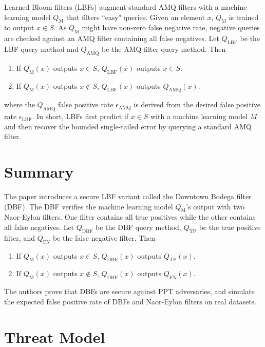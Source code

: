 \documentclass{article}
\begin{document}
Learned Bloom filters (LBFs) \cite{kraska_beutel_chi_dean_polyzotis_2018} augment standard AMQ filters with a machine learning model $Q_\text{M}$ that filters ``easy" queries. Given an element $x$, $Q_\text{M}$ is trained to output $x \in S$. As $Q_\text{M}$ might have non-zero false negative rate, negative queries are checked against an AMQ filter containing all false negatives. Let $Q_\text{LBF}$ be the LBF query method and $Q_\text{AMQ}$ be the AMQ filter query method. Then
\begin{enumerate}
    \item If $Q_\text{M}(x)$ outputs $x \in S$, $Q_\text{LBF}(x)$ outputs $x \in S$.
    \item If $Q_\text{M}(x)$ outputs $x \not \in S$, $Q_\text{LBF}(x)$ outputs $Q_\text{AMQ}(x)$.
\end{enumerate}
where the $Q_\text{AMQ}$ false positive rate $\epsilon_\text{AMQ}$ is derived from the desired false positive rate $\epsilon_\text{LBF}$. In short, LBFs first predict if $x \in S$ with a machine learning model $M$ and then recover the bounded single-tailed error by querying a standard AMQ filter.

\section{Summary}

The paper \cite{bishop_tirmazi_2025} introduces a secure LBF variant called the Downtown Bodega filter (DBF). The DBF verifies the machine learning model $Q_\text{M}$'s output with two Naor-Eylon filters. One filter contains all true positives while the other contains all false negatives. Let $Q_\text{DBF}$ be the DBF query method, $Q_\text{TP}$ be the true positive filter, and $Q_\text{FN}$ be the false negative filter. Then
\begin{enumerate}
    \item If $Q_\text{M}(x)$ outputs $x \in S$, $Q_\text{DBF}(x)$ outputs $Q_\text{TP}(x)$.
    \item If $Q_\text{M}(x)$ outputs $x \not \in S$, $Q_\text{DBF}(x)$ outputs $Q_\text{FN}(x)$.
\end{enumerate}
The authors prove that DBFs are secure against PPT adversaries, and simulate the expected false positive rate of DBFs and Naor-Eylon filters on real datasets.

\section{Threat Model}
\end{document}
